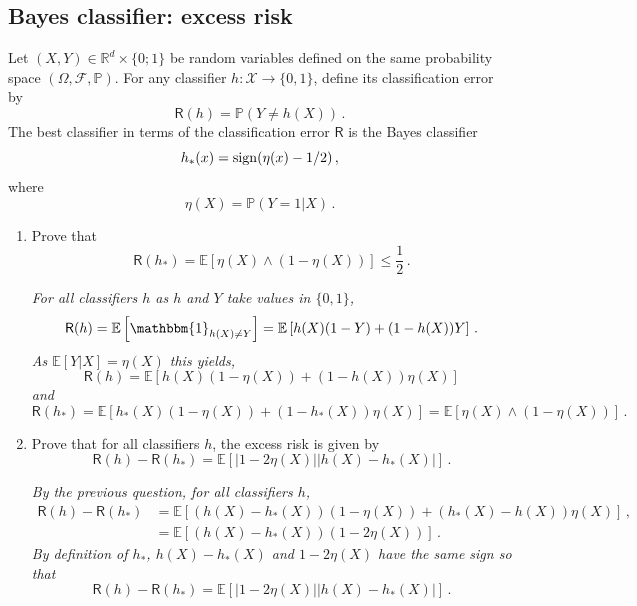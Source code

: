 \documentclass[a4paper,10pt,fleqn]{article}
\newcommand{\eqsp}{\,}
\newcommand{\calF}{\mathcal{F}}
\newcommand{\rset}{\ensuremath{\mathbb{R}}}
\newcommand{\bP}{\mathbb{P}}
\newcommand{\1}{\ensuremath{\mathbbm{1}}}
\begin{document}
\subsection{Bayes classifier: excess risk}
Let $(X,Y)\in\rset^d\times\{0;1\}$ be random variables defined on the same probability space $(\Omega,\calF,\bP)$.
For any classifier $h:\mathcal{X}\to \{0,1\}$, define its classification error by
$$
\mathsf{R}(h)=\bP(Y\neq h(X))\eqsp.
$$
The best classifier in terms of the classification error $\mathsf{R}$ is the Bayes classifier
$$
h_{*}(x)={\rm sign}(\eta(x)-1/2)\eqsp,
$$
where
$$
\eta(X) = \bP(Y=1|X)\eqsp.
$$
\begin{enumerate}
\item Prove that 
$$
\mathsf{R}(h_*) = \mathbb{E}\left[\eta(X) \wedge (1-\eta(X))\right]\leqslant \frac{1}{2}\eqsp.
$$

\vspace{.2cm}

{\em
For all classifiers $h$ as $h$ and $Y$ take values in $\{0,1\}$,
$$
\mathsf{R}(h) = \mathbb{E}\left[\1_{h(X)\neq Y}\right] = \mathbb{E}\left[h(X)(1-Y) + (1-h(X))Y\right]\eqsp.
$$
As $\mathbb{E}[Y|X] = \eta(X)$ this yields,
$$
\mathsf{R}(h) = \mathbb{E}\left[h(X)(1-\eta(X)) + (1-h(X))\eta(X)\right]
$$
and 
$$
\mathsf{R}(h_*) = \mathbb{E}\left[h_*(X)(1-\eta(X)) + (1-h_*(X))\eta(X)\right] =  \mathbb{E}\left[\eta(X) \wedge (1-\eta(X))\right]\eqsp.
$$
}
\item Prove that for all classifiers $h$, the excess risk is given by
$$
\mathsf{R}(h)  - \mathsf{R}(h_*) = \mathbb{E}\left[\left|1-2\eta(X)\right|\left|h(X) - h_*(X)\right|\right]\eqsp.
$$

\vspace{.2cm}

{\em
By the previous question, for all classifiers $h$,
\begin{align*}
\mathsf{R}(h)  - \mathsf{R}(h_*) &= \mathbb{E}\left[(h(X) - h_*(X))(1-\eta(X)) + (h_*(X)-h(X))\eta(X)\right]\eqsp,\\
 &= \mathbb{E}\left[(h(X) - h_*(X))(1-2\eta(X))\right]\eqsp.
\end{align*}
By definition of $h_*$, $h(X) - h_*(X)$ and $1-2\eta(X)$ have the same sign so that
$$
\mathsf{R}(h)  - \mathsf{R}(h_*) = \mathbb{E}\left[\left|1-2\eta(X)\right|\left|h(X) - h_*(X)\right|\right]\eqsp.
$$
}
\end{enumerate}
\end{document}
